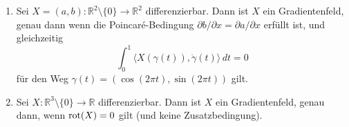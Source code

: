 \documentclass[../main.tex]{subfiles}
\begin{document}
\begin{proposition}\label{prop:low-dimensions}
  \leavevmode
  \begin{enumerate}[\normalfont(i)]
    \item Sei $X = (a, b) \colon \mathbb{R}^2 \setminus \{0\} \to \mathbb{R}^2$ 
      differenzierbar. Dann ist $X$ ein Gradientenfeld, genau dann wenn
      die Poincaré-Bedingung
      $\partial b / \partial x = \partial a / \partial x$ 
      erfüllt ist, und gleichzeitig
      \[
        \int_{0}^{1} \langle X(\gamma(t)), \dot \gamma(t) \rangle \, dt = 0
      \]
      für den Weg $\gamma(t) = (\cos(2\pi t), \sin(2 \pi t))$ gilt.
    \item Sei 
      $X \colon \mathbb{R}^3 \setminus \{0\} \to \mathbb{R}$ 
      differenzierbar.
      Dann ist $X$ ein Gradientenfeld, genau dann, wenn $\textup{rot}(X) = 0$
      gilt (und keine Zusatzbedingung).
  \end{enumerate}
\end{proposition}
\end{document}
